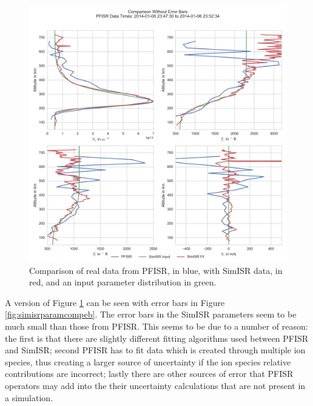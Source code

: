\begin{figure}[h!]
\centering
\includegraphics[width=4.5in]{Paramcomp}
\caption{Comparison of real data from PFISR, in blue, with SimISR data, in red, and an input parameter distribution in green.}
\label{fig:simisrparamcomp}
\end{figure}

A version of Figure \ref{fig:simisrparamcomp} can be seen with error bars in Figure \ref{fig:simisrparamcompeb}. The error bars in the SimISR parameters seem to be much small than those from PFISR. This seems to be due to a number of reason: the first is that there are slightly different fitting algorithms used between PFISR and SimISR; second PFISR has to fit data which is created through multiple ion species, thus creating a larger source of uncertainty if the ion species relative contributions are incorrect; lastly there are other sources of error that PFISR operators may add into the their uncertainty calculations that are not present in a simulation. 

